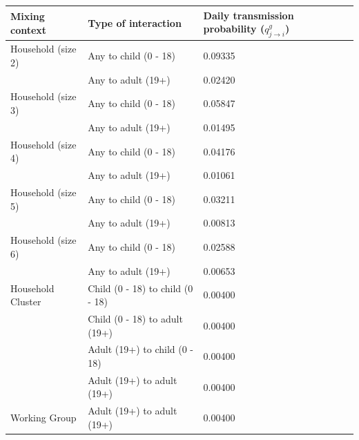 \documentclass{article}
\begin{document}
\begin{appendices}
\begin{table}
    \centering
    \begin{tabular}{l|l|l}
    Mixing context &  Type of interaction & Daily transmission probability ($q^g_{j \rightarrow i}$)\\
        \hline
    \hline
    \rule{0pt}{3ex}Household (size 2)   & Any to child (0 - 18)             &  \hspace{1.7cm} 0.09335\\
                                        & Any to adult (19+)                &  \hspace{1.7cm} 0.02420\\
    \rule{0pt}{3ex}Household (size 3)   & Any to child (0 - 18)             &  \hspace{1.7cm} 0.05847\\
                                       & Any to adult (19+)                &  \hspace{1.7cm} 0.01495\\
    \rule{0pt}{3ex}Household (size 4)   & Any to child (0 - 18)             &  \hspace{1.7cm} 0.04176\\
                                        & Any to adult (19+)                &  \hspace{1.7cm} 0.01061\\
    \rule{0pt}{3ex}Household (size 5)   & Any to child (0 - 18)             &  \hspace{1.7cm} 0.03211\\
                                        & Any to adult (19+)                &  \hspace{1.7cm} 0.00813\\
    \rule{0pt}{3ex}Household (size 6)   & Any to child (0 - 18)             &  \hspace{1.7cm} 0.02588\\
                                        & Any to adult (19+)                &  \hspace{1.7cm} 0.00653\\[0.1cm]
    
    \hline                              
    \rule{0pt}{3ex}Household Cluster    & Child (0 - 18) to child (0 - 18)  &  \hspace{1.7cm} 0.00400\\
                                        & Child (0 - 18) to adult (19+)     &  \hspace{1.7cm} 0.00400\\
                                        & Adult (19+)  to child (0 - 18)    &  \hspace{1.7cm} 0.00400\\
                                        & Adult (19+)  to adult (19+)       &  \hspace{1.7cm} 0.00400\\[0.1cm]
    \hline
    \rule{0pt}{3ex}Working Group        & Adult (19+)  to adult (19+)       &  \hspace{1.7cm} 0.00400\\[0.1cm]
    

\end{tabular}
\end{table}
\end{appendices}
\end{document}
